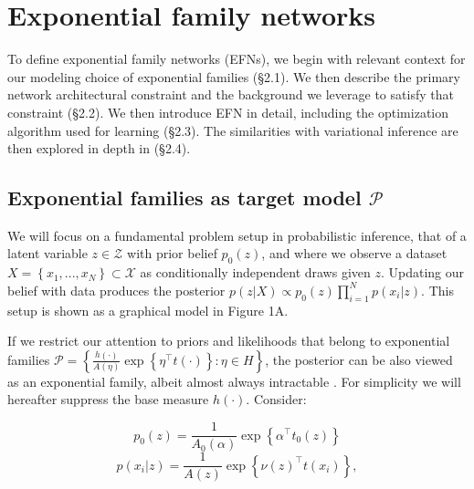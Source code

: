\documentclass[twoside]{article}
\begin{document}
\section{Exponential family networks}

To define exponential family networks (EFNs), we begin with relevant context for our modeling choice of exponential families (\S2.1).  We then describe the primary network architectural constraint and the background we leverage to satisfy that constraint (\S2.2). We then introduce EFN in detail, including the optimization algorithm used for learning (\S2.3).  The similarities with variational inference are then explored in depth in (\S2.4).

\subsection{Exponential families as target model $\mathcal{P}$}

We will focus on a fundamental problem setup in probabilistic inference, that of a latent variable $z \in \mathcal{Z}$ with prior belief $p_0(z)$, and where we observe a dataset $X = \left\{x_1,...,x_N\right\} \subset \mathcal{X}$ as conditionally independent draws given $z$.   Updating our belief with data produces the posterior $p(z | X) \propto p_0(z) \prod_{i=1}^N p(x_i | z)$.  This setup is shown as a graphical model in Figure 1A.

If we restrict our attention to priors and likelihoods that belong to exponential families $\mathcal{P} = \left\{ \frac{h(\cdot)}{A(\eta)} \exp\left\{ \eta^\top t(\cdot) \right \} : \eta \in H \right\}$, the posterior can be also viewed as an exponential family, albeit almost always intractable \citep{wainwright2008graphical}.  For simplicity we will hereafter suppress the base measure $h(\cdot)$.  Consider:

{\small 
\begin{equation}
 p_0(z) = \frac{1}{A_0(\alpha)} \exp\left\{ \alpha^\top t_0(z) \right\} 
 \label{eq:1}
 \end{equation}
 \begin{equation}
 p(x_i|z) = \frac{1}{A(z)} \exp\left\{ \nu(z)^\top t(x_i) \right \},
\label{eq:2}
 \end{equation} }
\end{document}
